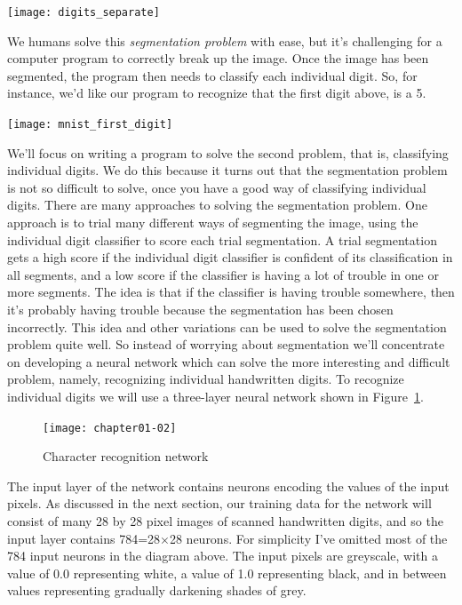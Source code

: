 \begin{marginfigure}
\texttt{[image: digits\_separate]}
\end{marginfigure}

We humans solve this \textit{segmentation problem} with ease, but it's challenging for a computer program to correctly break up the image. Once the image has been segmented, the program then needs to classify each individual digit. So, for instance, we'd like our program to recognize that the first digit above, is a 5.

\begin{marginfigure}
\texttt{[image: mnist\_first\_digit]}
\end{marginfigure}




We'll focus on writing a program to solve the second problem, that is, classifying individual digits. We do this because it turns out that the segmentation problem is not so difficult to solve, once you have a good way of classifying individual digits. There are many approaches to solving the segmentation problem. One approach is to trial many different ways of segmenting the image, using the individual digit classifier to score each trial segmentation. A trial segmentation gets a high score if the individual digit classifier is confident of its classification in all segments, and a low score if the classifier is having a lot of trouble in one or more segments. The idea is that if the classifier is having trouble somewhere, then it's probably having trouble because the segmentation has been chosen incorrectly. This idea and other variations can be used to solve the segmentation problem quite well. So instead of worrying about segmentation we'll concentrate on developing a neural network which can solve the more interesting and difficult problem, namely, recognizing individual handwritten digits.
To recognize individual digits we will use a three-layer neural network shown in Figure~\ref{fig:chapter01-02}.

\begin{figure}[tbhp]
\centering
\texttt{[image: chapter01-02]}
\caption{Character recognition network}
\label{fig:chapter01-02}
\end{figure}


The input layer of the network contains neurons encoding the values of the input pixels. As discussed in the next section, our training data for the network will consist of many 28 by 28 pixel images of scanned handwritten digits, and so the input layer contains 784=28$\times$28 neurons. For simplicity I've omitted most of the 784 input neurons in the diagram above. The input pixels are greyscale, with a value of 0.0 representing white, a value of 1.0 representing black, and in between values representing gradually darkening shades of grey.

